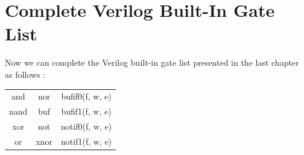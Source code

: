 \documentclass[12pt,openany, tikz,border=10pt]{book}
\begin{document}
\noindent
{}

\section{Complete Verilog Built-In Gate List}
Now we can complete the Verilog built-in gate list presented in the last chapter as follows :
\begin{center}
	\begin{tabular}{c|c|c}
		and  & nor & bufif0(f, w, e)  \\
		nand & buf & bufif1(f, w, e)  \\
		xor  & not & notif0(f, w, e) \\
		or   & xnor & notif1(f, w, e) \\
	\end{tabular}

\end{center}
\end{document}
